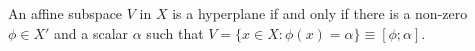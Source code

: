 An affine subspace $V$ in $X$ is a hyperplane if and only if there is a non-zero $\phi \in X'$ and a scalar $\alpha$ such that $V = \{x \in X : \phi(x) = \alpha\} \equiv [\phi; \alpha]$.
